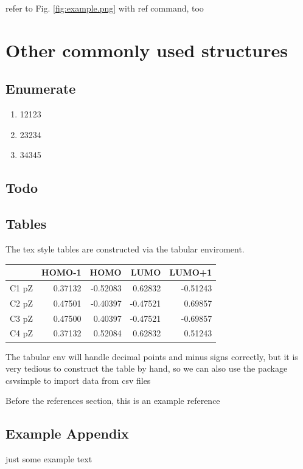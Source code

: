 \documentclass{article}
\begin{document}
refer to Fig. \ref{fig:example.png} with ref command, too

\section{Other commonly used structures}

\subsection{Enumerate}

\begin{enumerate}
	\item 12123
	\item 23234
	\item 34345
\end{enumerate}

\subsection{Todo}


\subsection{Tables}

The tex style tables are constructed via the tabular enviroment. 

\begin{tabular}{l r r r r}
	      & HOMO-1  & HOMO     & LUMO     & LUMO+1   \\
	\hline
	C1 pZ & 0.37132 & -0.52083 & 0.62832  & -0.51243 \\
	C2 pZ & 0.47501 & -0.40397 & -0.47521 & 0.69857  \\
	C3 pZ & 0.47500 & 0.40397  & -0.47521 & -0.69857 \\
	C4 pZ & 0.37132 & 0.52084  & 0.62832  & 0.51243  \\
\end{tabular}

The tabular env will handle decimal points and minus signs correctly, but it is very tedious to construct the table by hand, so we can also use the package csvsimple to import data from csv files


Before the references section, this is an example reference\cite{craig2004quantum}






\newpage

\begin{appendices}

	\section{Example Appendix}

	just some example text

\end{appendices}

\newpage

\printglossaries
\end{document}
